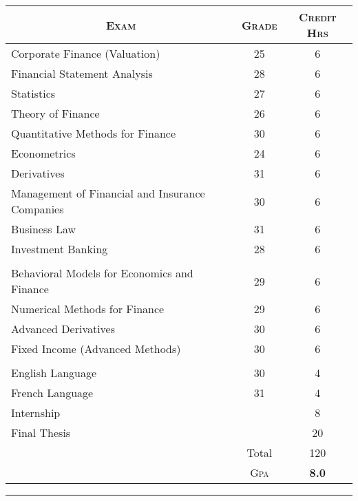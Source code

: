 \documentclass[a4paper,10pt]{article} %
\begin{document}
\begin{center}
  \begin{tabular}{lcc}
    \multicolumn{1}{c}{\textsc{Exam}}               & \textsc{Grade} & \textsc{Credit Hrs} \\ \hline
    Corporate Finance (Valuation)                   & 25             & 6                   \\
    Financial Statement Analysis                    & 28             & 6                   \\
    Statistics                                      & 27             & 6                   \\
    Theory of Finance                               & 26             & 6                   \\
    Quantitative Methods for Finance                & 30             & 6                   \\
    Econometrics                                    & 24             & 6                   \\
    Derivatives                                     & 31             & 6                   \\
    Management of Financial and Insurance Companies & 30             & 6                   \\
    Business Law                                    & 31             & 6                   \\
    Investment Banking                              & 28             & 6                   \\ \\    
    Behavioral Models for Economics and Finance     & 29             & 6                   \\
    Numerical Methods for Finance                   & 29             & 6                   \\
    Advanced Derivatives                            & 30             & 6                   \\
    Fixed Income (Advanced Methods)                 & 30             & 6                   \\ \\
    English Language                                & 30             & 4                   \\
    French Language                                 & 31             & 4                   \\ 
    Internship                                      &                & 8                   \\   
    Final Thesis                                    &                & 20                  \\ 
                                                    & Total          & 120                 \\\cline{2-3}
                                                    & \textsc{Gpa}   & \textbf{8.0}        
  \end{tabular}
\end{center}
\bigskip
\hrule
\bigskip
\end{document}
